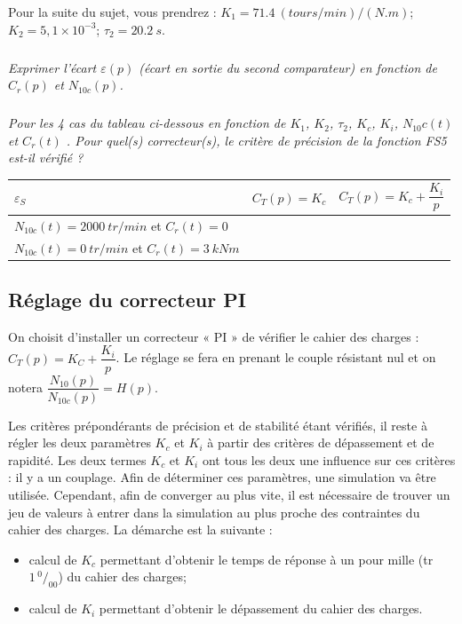 \documentclass[10pt,fleqn]{article} %
\begin{document}
\begin{multicols}{2}
Pour la suite du sujet, vous prendrez : $K_1 =\SI{71,4}{(tours/min)/(N.m)}$; $K_2=5,1 \times 10^{-3}$; $\tau_2 = \SI{20,2}{s}$.


\subparagraph{}\textit{Exprimer l'écart $\varepsilon(p)$ (écart en sortie du second comparateur) en fonction de $C_r(p)$ et $N_{10c}(p)$.}
\ifprof
\begin{corrige}
\end{corrige}
\else
\fi

\subparagraph{}\textit{Pour les 4 cas du tableau ci-dessous en fonction de $K_1$, $K_2$, $\tau_2$, $K_c$, $K_i$, $N_{10}c (t)$ et $C_r (t)$ . Pour quel(s) correcteur(s), le critère de précision de la fonction FS5 est-il vérifié ?}
\ifprof
\begin{corrige}
\end{corrige}
\else
\fi

\begin{center}
\begin{tabular}{|p{3cm}|c|c|}
\hline
$\varepsilon_S$ & $C_T(p)=K_c$ & $C_T(p)=K_c  + \dfrac{K_i}{p}$ \\
\hline
$N_{10c}(t)=\SI{2000}{tr/min}$ et $C_r(t)=0$ &  & \\
\hline
$N_{10c}(t)=\SI{0}{tr/min}$ et $C_r(t)=\SI{3}{kNm}$ &  & \\
\hline
\end{tabular}
\end{center}



\subsection*{Réglage du correcteur PI}

On choisit d’installer un correcteur « PI » de vérifier le cahier des charges : $C_T(p)=K_C + \dfrac{K_i}{p}$.
Le réglage se fera en prenant le couple résistant nul et on notera $\dfrac{N_{10}(p)}{N_{10c}(p)}=H(p)$.

Les critères prépondérants de précision et de stabilité étant vérifiés, il reste à régler les deux paramètres
$K_c$ et $K_i$ à partir des critères de dépassement et de rapidité. Les deux termes $K_c$ et $K_i$ ont tous
les deux une influence sur ces critères : il y a un couplage. Afin de déterminer ces paramètres, une
simulation va être utilisée. Cependant, afin de converger au plus vite, il est nécessaire de trouver un
jeu de valeurs à entrer dans la simulation au plus proche des contraintes du cahier des charges. La
démarche est la suivante :
\begin{itemize}
\item calcul de $K_c$ permettant d’obtenir le temps de réponse à un pour mille (tr$1 \,^0\!/_{00}$) du cahier des
charges;
\item calcul de $K_i$ permettant d’obtenir le dépassement du cahier des charges.
\end{itemize}




\end{multicols}
\end{document}
